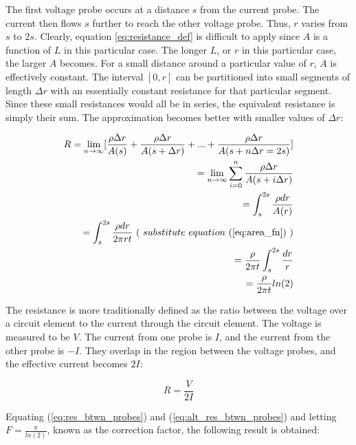 \documentclass{article}
\begin{document}
The first voltage probe occurs at a distance $s$ from the current probe. The current then flows $s$ further to reach the other voltage probe. Thus, $r$ varies from $s$ to $2s$. Clearly, equation \ref{eq:resistance_def} is difficult to apply since $A$ is a function of $L$ in this particular case. The longer $L$, or $r$ in this particular case, the larger $A$ becomes.
For a small distance around a particular value of $r$, $A$ is effectively constant. The interval $[0,r]$ can be partitioned into small segments of length $\Delta r$ with an essentially constant resistance for that particular segment. Since these small resistances would all be in series, the equivalent resistance is simply their sum. The approximation becomes better with smaller values of $\Delta r$:

\begin{equation}
\label{eq:res_btwn_probes}
\begin{aligned}
R = \lim_{n\to\infty} [ \frac{ \rho \Delta r }{ A(s) } + \frac{ \rho \Delta r }{ A(s + \Delta r) } + ... + \frac{ \rho \Delta r }{ A(s + n \Delta r = 2s ) } ] \\
= \lim_{n\to\infty} \sum_{i=0}^{n} \frac{ \rho \Delta r }{ A( s + i\Delta r )} \\
= \int_{s}^{2s} \frac{ \rho dr }{ A(r) } \\
= \int_{s}^{2s} \frac{ \rho dr }{ 2 \pi r t } \ ( \ substitute \ equation \ (\ref{eq:area_fn}) \ ) \\
= \frac{ \rho }{ 2 \pi t } \int_{s}^{2s} \frac{ dr }{ r } \\
= \frac{ \rho }{ 2 \pi t } ln(2)
\end{aligned}
\end{equation}

The resistance is more traditionally defined as the ratio between the voltage over a circuit element to the current through the circuit element. The voltage is measured to be $V$. The current from one probe is $I$, and the current from the other probe is $-I$. They overlap in the region between the voltage probes, and the effective current becomes $2I$:

\begin{equation}
\label{eq:alt_res_btwn_probes}
R = \frac{V}{2I}
\end{equation}

Equating (\ref{eq:res_btwn_probes}) and (\ref{eq:alt_res_btwn_probes}) and letting $F = \frac{\pi}{ln(2)}$, known as the correction factor, the following result is obtained:
\end{document}
